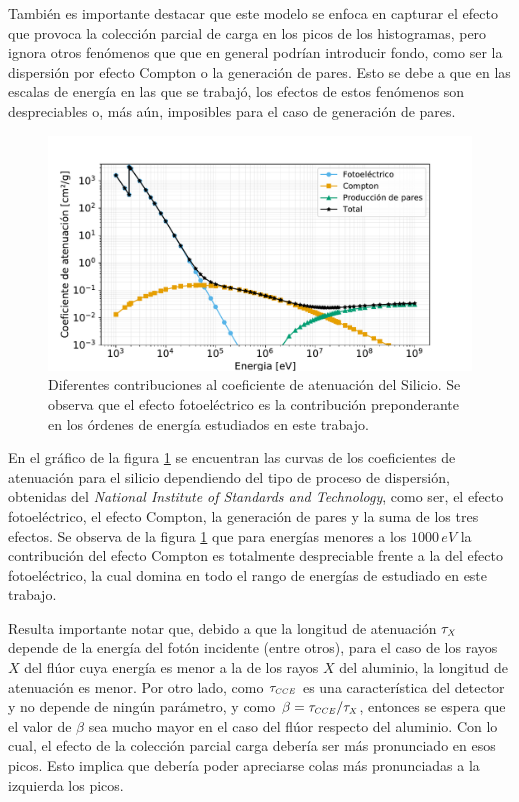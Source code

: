También es importante destacar que este modelo se enfoca en capturar el efecto que provoca la colección parcial de carga en los picos de los histogramas, pero ignora otros fenómenos que que en general podrían introducir fondo, como ser la dispersión por efecto Compton o la generación de pares. Esto se debe a que en las escalas de energía en las que se trabajó, los efectos de estos fenómenos son despreciables o, más aún, imposibles para el caso de generación de pares. 
\begin{figure}[h]
    \centering
        \includegraphics[scale=0.5]{Figs/FotoelectricoComptonPares_enSilicio.pdf}
    \caption{\footnotesize{Diferentes contribuciones al coeficiente de atenuación del Silicio. Se observa que el efecto fotoeléctrico es la contribución preponderante en los órdenes de energía estudiados en este trabajo.}}
    \label{fig:FotoelectricoComptonPares}
\end{figure}
En el gráfico de la figura \ref{fig:FotoelectricoComptonPares} se encuentran las curvas de los coeficientes de atenuación para el silicio dependiendo del tipo de proceso de dispersión, obtenidas del \textit{National Institute of Standards and Technology}\cite{FotoComptPar}, como ser, el efecto fotoeléctrico, el efecto Compton, la generación de pares y la suma de los tres efectos. Se observa de la figura \ref{fig:FotoelectricoComptonPares} que para energías menores a los $1000\,\si{eV}$ la contribución del efecto Compton es totalmente despreciable frente a la del efecto fotoeléctrico, la cual domina en todo el rango de energías de estudiado en este trabajo.

Resulta importante notar que, debido a que la longitud de atenuación $\tau_{\scaleto{X}{4pt}}$ depende de la energía del fotón incidente (entre otros), para el caso de los rayos $X$ del flúor cuya energía es menor a la de los rayos $X$ del aluminio, la longitud de atenuación es menor. Por otro lado, como $\tau_{\scaleto{CCE}{4pt}}$ es una característica del detector y no depende de ningún parámetro, y como $\beta = \tau_{\scaleto{CCE}{4pt}}/\tau_{\scaleto{X}{4pt}}$, entonces se espera que el valor de $\beta$ sea mucho mayor en el caso del flúor respecto del aluminio. Con lo cual, el efecto de la colección parcial carga debería ser más pronunciado en esos picos. Esto implica que debería poder apreciarse colas más pronunciadas a la izquierda los picos.

